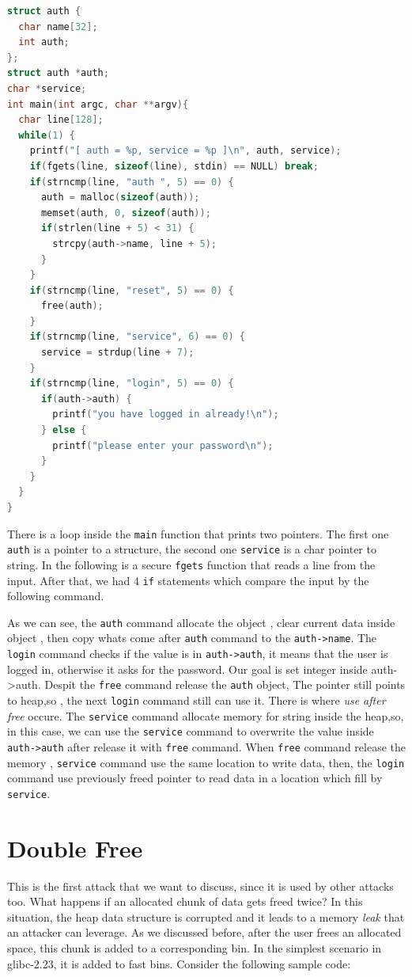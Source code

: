 \documentclass{masterthesis}
\newcommand*\libc{glibc}
\newcommand*\fb{fast bins}
\begin{document}
\begin{lstlisting}[language=c,frame=tlrb]
struct auth {
  char name[32];
  int auth;
};
struct auth *auth;
char *service;
int main(int argc, char **argv){
  char line[128];
  while(1) {
    printf("[ auth = %p, service = %p ]\n", auth, service);
    if(fgets(line, sizeof(line), stdin) == NULL) break;
    if(strncmp(line, "auth ", 5) == 0) {
      auth = malloc(sizeof(auth));
      memset(auth, 0, sizeof(auth));
      if(strlen(line + 5) < 31) {
        strcpy(auth->name, line + 5);
      }
    }
    if(strncmp(line, "reset", 5) == 0) {
      free(auth);
    }
    if(strncmp(line, "service", 6) == 0) {
      service = strdup(line + 7);
    }
    if(strncmp(line, "login", 5) == 0) {
      if(auth->auth) {
        printf("you have logged in already!\n");
      } else {
        printf("please enter your password\n");
      }
    }
  }
}
\end{lstlisting}

There is a loop inside the \lstinline{main} function that prints two pointers. The first one \lstinline{auth} is a pointer to a structure, the second one \lstinline{service} is a char pointer to string. In the following is a secure \lstinline{fgets} function that reads a line from the input. After that, we had 4 \lstinline{if} statements which compare the input by the following command.

As we can see, the \lstinline{auth} command allocate the object , clear current data inside object , then copy whats come after \lstinline{auth} command to the \lstinline{auth->name}. The \lstinline{login} command checks if the value is in \lstinline{auth->auth}, it means that the user is logged in, otherwise it asks for the password. Our goal is set integer inside {auth->auth}.
Despit the \lstinline{free} command release the \lstinline{auth} object, The pointer still points to heap,so , the next \lstinline{login} command still can use it. There is where \emph{use after free} occure.
The \lstinline{service} command allocate memory for string inside the heap,so, in this case, we can use the \lstinline{service} command to overwrite the value inside \lstinline{auth->auth} after release it with \lstinline{free} command. When \lstinline{free} command release the memory , \lstinline{service} command use the same location to write data, then, the \lstinline{login} command use previously freed pointer to read data in a location which fill by \lstinline{service}.

\section{Double Free}
\label{sect:doublefree}
This is the first attack that we want to discuss, since it is used by other attacks too. What happens if an allocated chunk of data gets freed twice? In this situation, the heap data structure is corrupted and it leads to a memory \emph{leak} that an attacker can leverage. As we discussed before, after the user frees an allocated space, this chunk is added to a corresponding bin. In the simplest scenario in \libc{-2.23}, it is added to \fb{}. Consider the following sample code:
\end{document}
